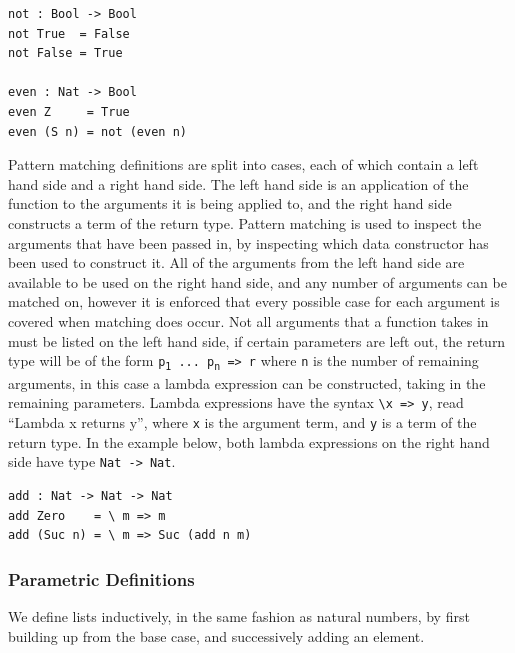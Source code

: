 \documentclass[a4paper]{article}
\begin{document}
\begin{center}
\begin{verbatim}
not : Bool -> Bool
not True  = False
not False = True

even : Nat -> Bool
even Z     = True
even (S n) = not (even n) 
\end{verbatim}
\end{center}

Pattern matching definitions are split into cases, each of which contain 
a left hand side and a right hand side.
The left hand side is an application of the function to the arguments
it is being applied to, and the right hand side constructs a term
of the return type. Pattern matching is used to inspect the arguments
that have been passed in, by inspecting which data constructor has been
used to construct it. All of the arguments from the left hand side are
available to be used on the right hand side, and any number of arguments
can be matched on, however it is enforced that every possible case for 
each argument is covered when matching does occur. Not all arguments that a function takes in 
must be listed on the left hand side, if certain parameters are left out,
the return type will be of the form \texttt{p\textsubscript{1} ... p\textsubscript{n} => r} where \texttt{n} is the 
number of remaining arguments, in this case a lambda expression can be 
constructed, taking in the remaining parameters. 
Lambda expressions have the syntax \texttt{\textbackslash  x => y}, read ``Lambda x
returns y'', where \texttt{x} is the argument term, and \texttt{y} is a term of the
return type. In the example below, both lambda expressions on the right
hand side have type \texttt{Nat -> Nat}.

\begin{center}
\begin{verbatim}
add : Nat -> Nat -> Nat
add Zero    = \ m => m
add (Suc n) = \ m => Suc (add n m)
\end{verbatim}
\end{center}



\subsubsection{Parametric Definitions}
\label{sec:org62c4f95}

We define lists inductively, in the same fashion as natural numbers, by
first building up from the base case, and successively adding an element.
\end{document}
